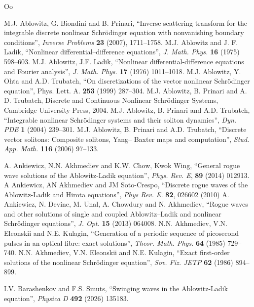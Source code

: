 \documentclass{article}
\begin{document}
\begin{thebibliography}{Oo}
\advance\itemsep-2pt

 M.J. Ablowitz, G. Biondini and B. Prinari, ``Inverse scattering transform for the integrable discrete nonlinear Schr\"odinger equation with nonvanishing boundary conditions'', 
\textit{Inverse Problems} \textbf{23} (2007), 1711--1758.
 M.J. Ablowitz and J. F. Ladik, ``Nonlinear differential–difference equations'', \textit{J. Math. Phys.} \textbf{16} (1975) 598--603.
 M.J. Ablowitz, J.F. Ladik, ``Nonlinear differential-difference equations and Fourier analysis'', \textit{J. Math. Phys.} \textbf{17} (1976) 1011–1018.
 M.J. Ablowitz, Y. Ohta and A.D. Trubatch, ``On discretizations of the vector nonlinear Schr\"odinger equation'', Phys. Lett. A. \textbf{253} (1999) 287--304.
 M.J. Ablowitz, B. Prinari and A. D. Trubatch, Discrete and Continuous Nonlinear Schr\"odinger Systems, Cambridge University Press, 2004.
 M.J. Ablowitz, B. Prinari and A.D. Trubatch, ``Integrable nonlinear 
Schr\"odinger systems and their soliton dynamics'', \textit{Dyn. PDE} \textbf{1} (2004) 239--301.
 M.J. Ablowitz, B. Prinari and A.D. Trubatch, ``Discrete vector solitons: Composite solitons, Yang– Baxter maps and computation'', \textit{Stud. App. Math.} \textbf{116} (2006) 97--133.

  A. Ankiewicz, N.N. Akhmediev and K.W. Chow, Kwok Wing, ``General rogue wave solutions of the Ablowitz-Ladik equation'', \textit{Phys. Rev. E}, \textbf{89} (2014)
012913.
 A Ankiewicz, AN Akhmediev and JM Soto-Crespo, ``Discrete rogue waves of the Ablowitz-Ladik and Hirota equations'', \textit{Phys Rev. E.} \textbf{82}, 026602 (2010)
 A. Ankiewicz, N. Devine, M. Unal, A. Chowdury and N. Akhmediev, ``Rogue waves and other solutions of single and coupled Ablowitz–Ladik and nonlinear Schr\"odinger equations'', \textit{J. Opt.} \textbf{15} (2013) 064008.
 N.N. Akhmediev, V.N. Eleonskii and N.E. Kulagin,
``Generation of a periodic sequence of picosecond pulses in an optical fibre: exact solutions'',
\textit{Theor. Math. Phys.} \textbf{64} (1985) 729--740.
 N.N. Akhmediev, V.N. Eleonskii and N.E. Kulagin, ``Exact first-order solutions of the nonlinear Schr{\"o}dinger equation'', \textit{Sov. Fiz. JETP} \textbf{62} (1986)
894--899.


 I.V. Barashenkov and F.S. Smuts, ``Swinging waves in the Ablowitz-Ladik equation'', \textit{Physica D} \textbf{492} (2026) 135183.


\end{thebibliography}
\end{document}
